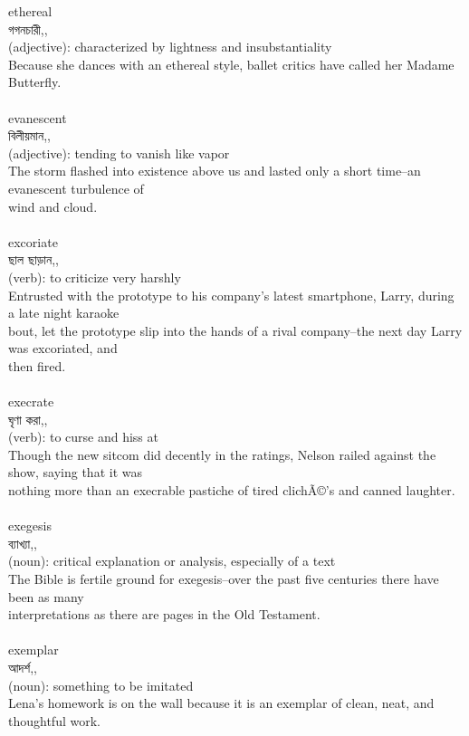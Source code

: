 \documentclass{article}
\begin{document}
{ethereal}\\
{গগনচারী,,}\\
{(adjective): characterized by lightness and insubstantiality\\Because she dances with an ethereal style, ballet critics have called her Madame Butterfly.\\}\\
{evanescent}\\
{বিলীয়মান,,}\\
{(adjective): tending to vanish like vapor\\The storm flashed into existence above us and lasted only a short time--an evanescent turbulence of\\wind and cloud.\\}\\
{excoriate}\\
{ছাল ছাড়ান,,}\\
{(verb): to criticize very harshly\\Entrusted with the prototype to his company's latest smartphone, Larry, during a late night karaoke\\bout, let the prototype slip into the hands of a rival company--the next day Larry was excoriated, and\\then fired.\\}\\
{execrate}\\
{ঘৃণা করা,,}\\
{(verb): to curse and hiss at\\Though the new sitcom did decently in the ratings, Nelson railed against the show, saying that it was\\nothing more than an execrable pastiche of tired clichÃ©'s and canned laughter.\\}\\
{exegesis}\\
{ব্যাখ্যা,,}\\
{(noun): critical explanation or analysis, especially of a text\\The Bible is fertile ground for exegesis--over the past five centuries there have been as many\\interpretations as there are pages in the Old Testament.\\}\\
{exemplar}\\
{আদর্শ,,}\\
{(noun): something to be imitated\\Lena's homework is on the wall because it is an exemplar of clean, neat, and thoughtful work.\\}\\
\end{document}
